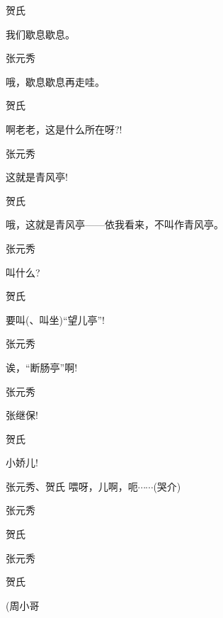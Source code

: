 贺氏\hspace{30pt}~

我们歇息歇息。

张元秀\hspace{20pt}~

哦，歇息歇息再走哇。

贺氏\hspace{30pt}~

啊老老，这是什么所在呀?!

张元秀\hspace{20pt}~

这就是青风亭!

贺氏\hspace{30pt}~

哦，这就是青风亭------依我看来，不叫作青风亭。

张元秀\hspace{20pt}~

叫什么?

贺氏\hspace{30pt}~

要叫(、叫坐)``望儿亭''!

张元秀\hspace{20pt}~

诶，``断肠亭''啊!

张元秀\hspace{20pt}~

张继保!

贺氏\hspace{30pt}~

小娇儿!

张元秀、贺氏 喂呀，儿啊，呃$\cdots{}\cdots{}$(哭介)

张元秀\hspace{20pt}~


贺氏\hspace{30pt}~


张元秀


贺氏\hspace{30pt}~


(周小哥

